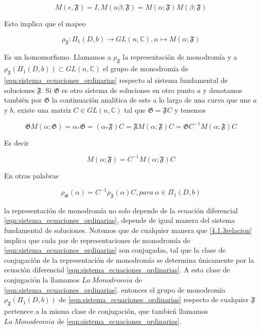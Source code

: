 $$M(e,\mathfrak{F}) = I , M(\alpha \beta ;\mathfrak{F}) = M(\alpha ;\mathfrak{F})M(\beta ;\mathfrak{F}) $$

Esto implica que el mapeo

$$\rho_{\mathfrak{F}}: \Pi_{1} (D,b) \rightarrow GL(n,\mathbb{C}), \alpha \mapsto M(\alpha ; \mathfrak{F}) $$

Es un homomorfismo. Llamamos a $\rho_{\mathfrak{F}}$ la representaci\'on de monodrom\'ia y a $\rho_{\mathfrak{F}}(\Pi_{1} (D,b)) \subset GL(n, \mathbb{C})$ el grupo de monodrom\'ia de \ref{eqn:sistema_ecuaciones_ordinarias} respecto al sistema fundamental de soluciones $\mathfrak{F}$. Si $\mathfrak{G}$ es otro sistema de soluciones en otro punto $a$ y denotamos tambi\'en por $\mathfrak{G}$ la continuaci\'on anal\'itica de este a lo largo de una curva que une $a$ y $b$, existe una matriz $C \in GL(n,\mathbb{C})$ tal que $\mathfrak{G} = \mathfrak{F} C$ y tenemos

$$\mathfrak{G} M(\alpha ; \mathfrak{G})=\alpha_{*} \mathfrak{G} = (\alpha_{*} \mathfrak{F}) C  = \mathfrak{F} M(\alpha ; \mathfrak{F}) C = \mathfrak{G} C^{-1 } M(\alpha ; \mathfrak{F}) C $$

Es decir

$$M(\alpha ; \mathfrak{F}) = C^{-1} M(\alpha ; \mathfrak{F} )C$$

En otras palabras

\begin{equation} \label{4.1.3relacion}
\rho_{\mathfrak{G}}(\alpha)=C^{-1} \rho_{\mathfrak{F}}(\alpha) C, para \ \alpha \in \Pi_{1} (D,b)
\end{equation}

la representaci\'on de monodrom\'ia no solo depende de la ecuaci\'on diferencial \ref{eqn:sistema_ecuaciones_ordinarias}, depende de igual manera del sistema fundamental de soluciones. Notemos que de cualquier manera que \ref{4.1.3relacion} implica que cada par de representaciones de monodrom\'ia de \ref{eqn:sistema_ecuaciones_ordinarias} son conjugadas, tal que la clase de conjugaci\'on de la representaci\'on de monodrom\'ia se determina \'unicamente por la ecuaci\'on diferencial \ref{eqn:sistema_ecuaciones_ordinarias}. A esta clase de conjugaci\'on la llamamos $La \ Monodromia$ de \ref{eqn:sistema_ecuaciones_ordinarias}. entonces el grupo de monodrom\'ia $\rho_{\mathfrak{F}} (\Pi_{1} (D,b))$ de \ref{eqn:sistema_ecuaciones_ordinarias} respecto de cualquier $\mathfrak{F} $ pertenece a la misma clase de conjugaci\'on, que tambie\'n llamamos $La \ Monodromia$ de \ref{eqn:sistema_ecuaciones_ordinarias}.


